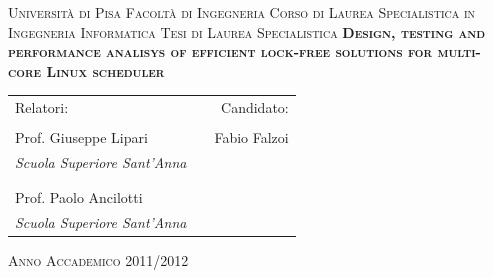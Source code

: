 \thispagestyle{empty}
\begin{center}
  \textsc{\Large Universit\`a di Pisa}
  \vskip3mm
  \textsc{\large Facolt\`a di Ingegneria}
  \vskip3mm
  \textsc{\normalsize Corso di Laurea Specialistica in Ingegneria Informatica}
  \vskip5mm
  \textsc{\large Tesi di Laurea Specialistica}
  \vskip22mm
  \vfill
  \textsc{\textbf{\huge Design, testing and performance analisys of efficient 
lock-free solutions for multi-core Linux scheduler\\}}
  \vfill
  \vskip22mm

  \begin{tabular*}{\textwidth}{@{\extracolsep{\fill}}lcr}
    Relatori: 				            & \hfill & Candidato: \\
    & & \\
    Prof. Giuseppe Lipari                & \hfill & Fabio Falzoi \\
    \emph{\scriptsize Scuola Superiore Sant'Anna } & \hfill & \\
    & & \\
    & & \\
    Prof. Paolo Ancilotti   & \hfill & \\
    \emph{\scriptsize Scuola Superiore Sant'Anna }        & \hfill & \\
  \end{tabular*}
  \vskip12mm
  \textsc{\normalsize Anno Accademico 2011/2012}
\end{center}

